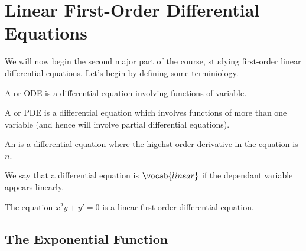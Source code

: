 \documentclass[a4paper]{scrreprt}
\begin{document}


\chapter{Linear First-Order Differential Equations}

We will now begin the second major part of the course, studying first-order linear differential equations. 
Let's begin by defining some terminiology.

\begin{definition}[ODE]
	A  or ODE is a differential equation involving functions of variable.
\end{definition}
\begin{definition}[PDE]
	A  or PDE is a differential equation which involves functions of more than one variable (and hence will involve partial differential equations).
\end{definition}

\begin{definition}[Order of a DE]
	An  is a differential equation where the higehst order derivative in the equation is $n$.
\end{definition}

\begin{definition}
	We say that a differential equation is $\vocab{linear}$ if the dependant variable appears linearly.
\end{definition}

\begin{example}
	The equation $x^2 y + y' = 0$ is a linear first order differential equation.
\end{example}

\section{The Exponential Function}
\end{document}
